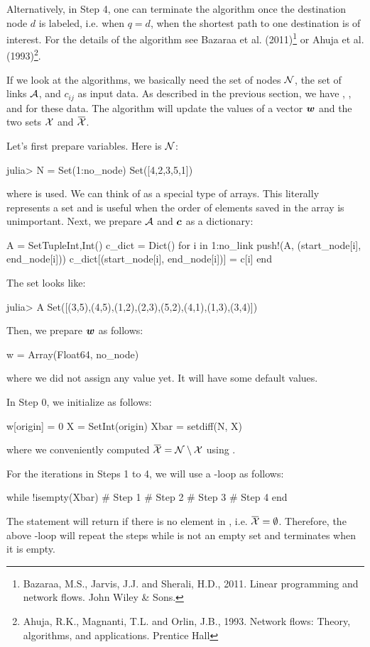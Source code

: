 Alternatively, in Step 4, one can terminate the algorithm once the destination node $d$ is labeled, i.e. when $q=d$, when the shortest path to one destination is of interest. For the details of the algorithm see Bazaraa et al. (2011)\footnote{Bazaraa, M.S., Jarvis, J.J. and Sherali, H.D., 2011. Linear programming and network flows. John Wiley \& Sons.} or Ahuja et al. (1993)\footnote{Ahuja, R.K., Magnanti, T.L. and Orlin, J.B., 1993. Network flows: Theory, algorithms, and applications. Prentice Hall}.

If we look at the algorithms, we basically need the set of nodes $\mathcal{N}$, the set of links $\mathcal{A}$, and $c_{ij}$ as input data. As described in the previous section, we have , , and  for these data. The algorithm will update the values of a vector $\boldsymbol{w}$ and the two sets $\mathcal{X}$ and $\bar{\Xc}$.

Let's first prepare variables. Here is $\mathcal{N}$:
\begin{code}
julia> N = Set(1:no_node)
Set([4,2,3,5,1])
\end{code}
\noindent where  is used. We can think of  as a special type of arrays. This literally represents a set and is useful when the order of elements saved in the array is unimportant. Next, we prepare $\mathcal{A}$ and $\boldsymbol{c}$ as a dictionary:
\begin{code}
A = Set{Tuple{Int,Int}}()
c_dict = Dict()
for i in 1:no_link
	push!(A, (start_node[i], end_node[i]))
	c_dict[(start_node[i], end_node[i])] = c[i]
end
\end{code}
\noindent The set  looks like:
\begin{code}
julia>  A
Set([(3,5),(4,5),(1,2),(2,3),(5,2),(4,1),(1,3),(3,4)])
\end{code}
\noindent Then, we prepare $\boldsymbol{w}$ as follows:
\begin{code}
w = Array(Float64, no_node)
\end{code}
\noindent where we did not assign any value yet. It will have some default values.

In Step 0, we initialize as follows:
\begin{code}
w[origin] = 0
X = Set{Int}({origin})
Xbar = setdiff(N, X)
\end{code}
\noindent where we conveniently computed $\bar{\Xc} = \Nc \setminus \Xc$ using .

For the iterations in Steps 1 to 4, we will use a -loop as follows:
\begin{code}
while !isempty(Xbar)
	# Step 1
	# Step 2
	# Step 3
	# Step 4
end
\end{code}
\noindent The statement  will return  if there is no element in , i.e. $\bar{\Xc}=\emptyset$. Therefore, the above -loop will repeat the steps while  is not an empty set and terminates when it is empty.

